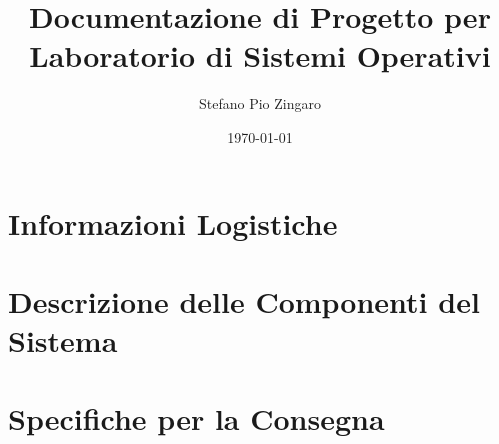 \documentclass{scrarticle}
\title{Documentazione di Progetto per Laboratorio di Sistemi Operativi}
\author{Stefano Pio Zingaro}
\date{\today}
\begin{document}
\maketitle

\tableofcontents

\section{Informazioni Logistiche}

\section{Descrizione delle Componenti del Sistema}

\section{Specifiche per la Consegna}



\end{document}
